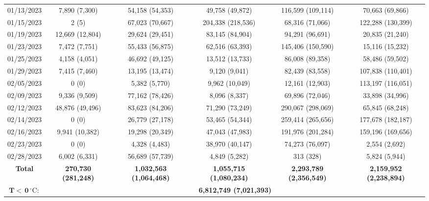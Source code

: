 \documentclass[amt, manuscript]{copernicus}
\begin{document}
\begin{table}
\begin{tabular}{c c c c c c}
        01/13/2023 & 7,890 (7,300)  & 54,158 (54,353) & 49,758 (49,872) & 116,599 (109,114) &  70,663 (69,866) \tabularnewline
        01/15/2023 & 2 (5) & 67,023 (70,667) & 204,338 (218,536) & 68,316 (71,066) & 122,288 (130,399) \tabularnewline
        01/19/2023 & 12,669 (12,804) & 29,624 (29,451) & 83,145 (84,904) & 94,291 (96,691) &  20,835 (21,240)  \tabularnewline
        01/23/2023 & 7,472 (7,751) & 55,433 (56,875) & 62,516 (63,393) & 145,406 (150,590) & 15,116 (15,232)  \tabularnewline
        01/25/2023 & 4,158 (4,051)  & 46,692 (49,125) & 13,512 (13,733) & 86,008 (89,358) & 58,486 (59,502) \tabularnewline
        01/29/2023 & 7,415 (7,460)  & 13,195 (13,474) & 9,120 (9,041) & 82,439 (83,558) & 107,838 (110,401)  \tabularnewline
        02/05/2023 & 0 (0) & 5,382 (5,770) & 9,962 (10,049) & 12,161 (12,903) &  113,197 (116,051) \tabularnewline
        02/09/2023 & 9,336 (9,509) & 77,162 (78,426) & 8,096 (8,337)  & 69,896 (72,046) & 33,898 (34,996)  \tabularnewline
        02/12/2023 & 48,876 (49,496) & 83,623 (84,206) & 71,290 (73,249) & 290,067 (298,069) & 65,845 (68,248)  \tabularnewline
        02/14/2023 & 0 (0) & 26,779 (27,178) & 53,465 (54,344) & 259,414 (265,656) & 177,678 (182,187) \tabularnewline
        02/16/2023 & 9,941 (10,382) & 19,298 (20,349) & 47,043 (47,983) & 191,976 (201,284) & 159,196 (169,656)  \tabularnewline
        02/23/2023 & 0 (0) & 4,328 (4,483) & 38,970 (40,147) & 74,273 (76,097) &  2,554 (2,692) \tabularnewline
        02/28/2023 & 6,002 (6,331) & 56,689 (57,739) & 4,849 (5,282) & 313 (328) & 5,824 (5,944)   \tabularnewline
       \midrule 
       \textbf{Total} & \textbf{270,730 (281,248)}  & \textbf{1,032,563 (1,064,468)}  & \textbf{1,055,715 (1,080,234)}  & \textbf{2,293,789 (2,356,549)} & \textbf{2,159,952 (2,238,894)} \tabularnewline
       \midrule 
       $\mathbf{T<\, 0\, ^{\circ}\mathrm{C}}:$& \multicolumn{5}{c}{ \textbf{6,812,749 (7,021,393)}}\tabularnewline
       \bottomrule
 \end{tabular}
    \label{table:cases}
\end{table}
\FloatBarrier

\end{document}
